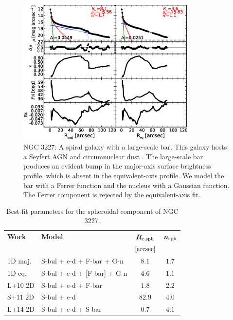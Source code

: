 \documentclass[preprint2]{emulateapj}
\newcommand{\fitfigurewidth}{0.8\textwidth}
\begin{document}
  \begin{figure}[h]
  \begin{center}
  \includegraphics[width=\fitfigurewidth]{images/n3227_1Dfit.eps}
  \caption{NGC 3227: 
  A spiral galaxy with a large-scale bar. 
  This galaxy hosts a Seyfert AGN \citep{khachikian1974} and circumnuclear dust \citep{martini2003}. 
  The large-scale bar produces an evident bump in the major-axis surface brightness profile,
  which is absent in the equivalent-axis profile. 
  We model the bar with a Ferrer function and the nucleus with a Gaussian function. 
  The Ferrer component is rejected by the equivalent-axis fit. 
  }
  \end{center}
  \end{figure}

  \begin{table}[h]
  \small
  \caption{Best-fit parameters for the spheroidal component of NGC 3227.}
  \begin{center}
  \begin{tabular}{llcc}
  \hline
  {\bf Work} & {\bf Model}   & $\bm R_{\rm e,sph}$    & $\bm n_{\rm sph}$ \\
    &  &  $[\rm arcsec]$ & \\
  \hline
  1D maj. & S-bul + e-d + F-bar + G-n   & $8.1$  &  $1.7$ \\
  1D eq.  & S-bul + e-d + [F-bar] + G-n & $4.6$  &  $1.1$ \\
  \hline
  L+10 2D         & S-bul + e-d + F-bar & $1.8$  &  $2.2$ \\
  S+11 2D         & S-bul + e-d	     & $82.9$ &  $4.0$ \\
  L+14 2D         & S-bul + e-d + S-bar & $0.7$  &  $4.1$ \\
  \hline
  \end{tabular}
  \end{center}
  \label{tab:n3227}
  \end{table}
\end{document}
